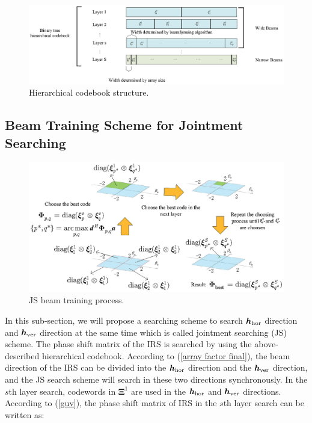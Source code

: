 \documentclass[12pt,draftclsnofoot,onecolumn]{IEEEtran}
\begin{document}
	\begin{figure}[!ht]
		\centering
		\includegraphics[scale=1]{codebook_u.eps}
		\caption{ Hierarchical codebook structure.}     \label{codebook_u}
	\end{figure}	
	
	
	
	
	\subsection{Beam Training Scheme for Jointment Searching}
	\begin{figure}
		\centering
		\includegraphics[scale=1]{JS_codebook.eps}
		\caption{ JS beam training process.}     \label{JS}
	\end{figure}
	In this sub-section, we will propose a searching scheme to search ${\bm h}_{\rm hor}$ direction and ${\bm h}_{\rm ver}$ direction at the same time which is called jointment searching (JS) scheme. The phase shift matrix  of the IRS is searched by using the above-described hierarchical codebook.  According to (\ref{array factor final}), the beam direction of the IRS can be divided into the ${\bm h}_{\rm hor}$ direction and the ${\bm h}_{\rm ver}$ direction, and the JS search scheme will search in these two directions synchronously. In the $s$th layer search, codewords in ${\bm \Xi}^1$ are used in the ${\bm h}_{\rm hor}$ and ${\bm h}_{\rm ver}$ directions. According to (\ref{guv}),  the phase shift matrix of IRS in the  $s$th layer search can be written as:
\end{document}

